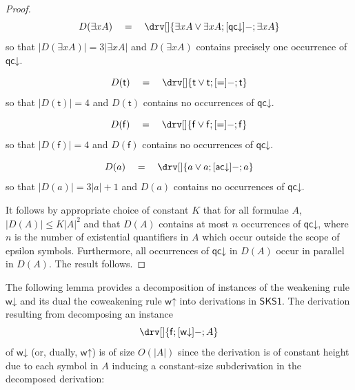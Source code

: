 \documentclass[10pt]{article}
\theoremstyle{definition}\newtheorem{remark}[theorem]{Remark}
\theoremstyle{definition}\newtheorem{example}[theorem]{Example}
\theoremstyle{definition}\newtheorem{definition}[theorem]{Definition}
\newcommand{\SKSqDecomp}{{\mathsf{SKS1}}}
\newcommand{\acDown}{{\mathsf{ac\mathord\downarrow}}}
\newcommand{\wUp}{{\mathsf{w\mathord\uparrow}}}
\newcommand{\wDown}{{\mathsf{w\mathord\downarrow}}}
\newcommand{\qcDown}{{\mathsf{qc\mathord\downarrow}}}
\newcommand{\trueUnit}{\mathsf{t}}
\newcommand{\falseUnit}{\mathsf{f}}
\begin{document}
\begin{proof}
		\[
		D(\exists x A) \hspace{1em} = \hspace{1em} \drv[] {
			\exists x A \lor \exists x A ; [\qcDown]- ; \exists x A
		}
		\]
		so that $| D(\exists x A) | = 3 | \exists x A |$ and $D(\exists x A)$ contains precisely one occurrence of $\qcDown$.
		
		\[
		D(\trueUnit) \hspace{1em} = \hspace{1em} \drv[] {
			\trueUnit \lor \trueUnit ; [=]- ; \trueUnit
		}
		\]
		so that $| D(\trueUnit) | = 4$ and $D(\trueUnit)$ contains no occurrences of $\qcDown$.
		
		\[
		D(\falseUnit) \hspace{1em} = \hspace{1em} \drv[] {
			\falseUnit \lor \falseUnit ; [=]- ; \falseUnit
		}
		\]
		so that $| D(\falseUnit) | = 4$ and $D(\falseUnit)$ contains no occurrences of $\qcDown$.
		
		\[
		D(a) \hspace{1em} = \hspace{1em} \drv[] {
			a \lor a ; [\acDown]- ; a
		}
		\]
		so that $| D(a) | = 3 | a | + 1$ and $D(a)$ contains no occurrences of $\qcDown$.
		
		It follows by appropriate choice of constant $K$ that for all formulae $A$, $| D(A) | \leq K| A |^2$ and that $D(A)$ contains at most $n$ occurrences of $\qcDown$, where $n$ is the number of existential quantifiers in $A$ which occur outside the scope of epsilon symbols. Furthermore, all occurrences of $\qcDown$ in $D(A)$ occur in parallel in $D(A)$. The result follows.
	\end{proof}
	
	The following lemma provides a decomposition of instances of the weakening rule $\wDown$ and its dual the coweakening rule $\wUp$ into derivations in $\SKSqDecomp$. The derivation resulting from decomposing an instance
	\[
	\drv[] {
		\falseUnit ; [\wDown]- ; A
	}
	\]
	of $\wDown$ (or, dually, $\wUp$) is of size $O(| A |)$ since the derivation is of constant height due to each symbol in $A$ inducing a constant-size subderivation in the decomposed derivation:
	\begin{center}
	\end{center}
	
\end{document}
